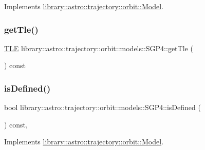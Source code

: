 Implements \hyperlink{classlibrary_1_1astro_1_1trajectory_1_1orbit_1_1_model_a940f5e266feb90ee8264d4c7a8a883f3}{library\+::astro\+::trajectory\+::orbit\+::\+Model}.

\mbox{\label{classlibrary_1_1astro_1_1trajectory_1_1orbit_1_1models_1_1_s_g_p4_a45a7bfb2099d304436898113706e1000}} 
\subsubsection{\texorpdfstring{get\+Tle()}{getTle()}}
{\footnotesize\ttfamily \hyperlink{classlibrary_1_1astro_1_1trajectory_1_1orbit_1_1models_1_1sgp4_1_1_t_l_e}{T\+LE} library\+::astro\+::trajectory\+::orbit\+::models\+::\+S\+G\+P4\+::get\+Tle (\begin{DoxyParamCaption}{ }\end{DoxyParamCaption}) const}

\mbox{\label{classlibrary_1_1astro_1_1trajectory_1_1orbit_1_1models_1_1_s_g_p4_a2d70ef4601e453156a430115e11ce8d7}} 
\subsubsection{\texorpdfstring{is\+Defined()}{isDefined()}}
{\footnotesize\ttfamily bool library\+::astro\+::trajectory\+::orbit\+::models\+::\+S\+G\+P4\+::is\+Defined (\begin{DoxyParamCaption}{ }\end{DoxyParamCaption}) const\hspace{0.3cm}{\ttfamily [override]}, {\ttfamily [virtual]}}



Implements \hyperlink{classlibrary_1_1astro_1_1trajectory_1_1orbit_1_1_model_a518785603421d259e427bd0a6ee5e787}{library\+::astro\+::trajectory\+::orbit\+::\+Model}.

